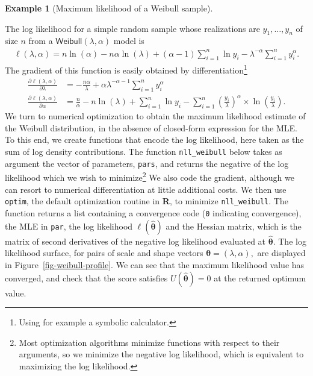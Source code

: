 \documentclass[
  11pt,
  letterpaper,
]{scrbook}
\theoremstyle{plain}
\theoremstyle{definition}
\newtheorem{example}{Example}[chapter]
\theoremstyle{definition}
\theoremstyle{remark}
\begin{document}
\begin{example}[Maximum likelihood of a Weibull
sample]\protect\hypertarget{exm-weibull-mle}{}\label{exm-weibull-mle}

The log likelihood for a simple random sample whose realizations are
\(y_1, \ldots, y_n\) of size \(n\) from a
\(\mathsf{Weibull}(\lambda, \alpha)\) model is \begin{align*}
\ell(\lambda, \alpha) = n \ln(\alpha) - n\alpha\ln(\lambda) + (\alpha-1) \sum_{i=1}^n \ln y_i  - \lambda^{-\alpha}\sum_{i=1}^n y_i^\alpha.
\end{align*} The gradient of this function is easily obtained by
differentiation\footnote{Using for example a symbolic calculator.}
\begin{align*}
\frac{\partial \ell(\lambda, \alpha)}{\partial \lambda} &= -\frac{n\alpha}{\lambda} +\alpha\lambda^{-\alpha-1}\sum_{i=1}^n y_i^\alpha \\
\frac{\partial \ell(\lambda, \alpha)}{\partial \alpha} &= \frac{n}{\alpha} - n \ln(\lambda) + \sum_{i=1}^n \ln y_i  - \sum_{i=1}^n \left(\frac{y_i}{\lambda}\right)^{\alpha} \times\ln\left(\frac{y_i}{\lambda}\right).
\end{align*} We turn to numerical optimization to obtain the maximum
likelihood estimate of the Weibull distribution, in the absence of
closed-form expression for the MLE. To this end, we create functions
that encode the log likelihood, here taken as the sum of log density
contributions. The function \texttt{nll\_weibull} below takes as
argument the vector of parameters, \texttt{pars}, and returns the
negative of the log likelihood which we wish to minimize\footnote{Most
  optimization algorithms minimize functions with respect to their
  arguments, so we minimize the negative log likelihood, which is
  equivalent to maximizing the log likelihood.} We also code the
gradient, although we can resort to numerical differentiation at little
additional costs. We then use \texttt{optim}, the default optimization
routine in \textbf{R}, to minimize \texttt{nll\_weibull}. The function
returns a list containing a convergence code (\texttt{0} indicating
convergence), the MLE in \texttt{par}, the log likelihood
\(\ell(\widehat{\boldsymbol{\theta}})\) and the Hessian matrix, which is
the matrix of second derivatives of the negative log likelihood
evaluated at \(\widehat{\boldsymbol{\theta}}.\) The log likelihood
surface, for pairs of scale and shape vectors
\(\boldsymbol{\theta} = (\lambda, \alpha),\) are displayed in
Figure~\ref{fig-weibull-profile}. We can see that the maximum likelihood
value has converged, and check that the score satisfies
\(U(\widehat{\boldsymbol{\theta}}) = 0\) at the returned optimum value.


\end{example}
\end{document}
